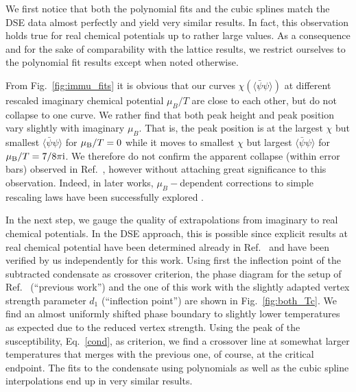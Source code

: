 \documentclass[%
    aps,
    prd,
    reprint,
    superscriptaddress,
    floatfix,
    nofootinbib,
    noamsmath,
    noamssymb
]{revtex4-2}
\newcommand*{\+}{\hspace*{.08335em}}
\newcommand*{\?}{\hspace*{-.08335em}}
\newcommand*{\ii}{\mathrm{i}}
\newcommand*{\muB}{\mu_{\textup{B}}}
\newcommand*{\cond}{\langle \bar{\psi} \psi \rangle}
\begin{document}
We first notice that both the polynomial fits and the cubic splines match the
DSE data almost perfectly and yield very similar results. In fact, this
observation holds true for real chemical potentials up to rather large values.
As a consequence and for the sake of comparability with the lattice results, we
restrict ourselves to the polynomial fit results except when noted otherwise.

From Fig.~\ref{fig:immu_fits} it is obvious that our curves $\chi(\cond)$ at
different rescaled imaginary chemical potential $\mu_B/T$ are close to each
other, but do not collapse to one curve. We rather find that both peak height
and peak position vary slightly with imaginary $\mu_B$. That is, the peak
position is at the largest $\chi$ but smallest $\cond$ for $\muB / T = 0$ while
it moves to smallest $\chi$ but largest $\cond$ for $\muB / T = 7/8 \pi \ii$. We
therefore do not confirm the apparent collapse (within error bars) observed in
Ref.~\cite{Borsanyi:2020fev}, however without attaching great significance to
this observation. Indeed, in later works, $\mu_B-$dependent corrections to
simple rescaling laws have been successfully explored
\cite{Borsanyi:2021sxv,Borsanyi2022a}.

In the next step, we gauge the quality of extrapolations from imaginary to real
chemical potentials. In the DSE approach, this is possible since explicit
results at real chemical potential have been determined already in
Ref.~\cite{Gunkel:2021oya} and have been verified by us independently for this
work. Using first the inflection point of the subtracted condensate as crossover
criterion, the phase diagram for the setup of Ref.~\cite{Gunkel:2021oya}
(``previous work'') and the one of this work with the slightly adapted vertex
strength parameter $d_1$ (``inflection point'') are shown in
Fig.~\ref{fig:both_Tc}. We find an almost uniformly shifted phase boundary to
slightly lower temperatures as expected due to the reduced vertex strength.
Using the peak of the susceptibility, Eq.~\eqref{cond}, as criterion, we find a
crossover line at somewhat larger temperatures that merges with the previous
one, of course, at the critical endpoint. The fits to the condensate using
polynomials as well as the cubic spline interpolations end up in very similar
results.
\end{document}
